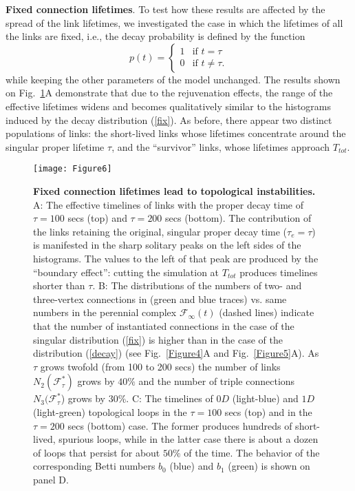 \documentclass[12pt,tightenlines]{revtex4}
\begin{document}
\textbf{Fixed connection lifetimes}. To test how these results are affected by the spread of the link lifetimes, we investigated 
the case in which the lifetimes of all the links are fixed, i.e., the decay probability is defined by the function
\begin{equation}
p(t) = \begin{cases} 1 &\mbox{if } t = \tau \\ 
0 & \mbox{if } t \neq \tau. 
\end{cases}
\label{fix}
\end{equation}
while keeping the other parameters of the model unchanged. The results shown on Fig.~\ref{Figure6}A demonstrate that 
due to the rejuvenation effects, the range of the effective lifetimes widens and becomes qualitatively similar to the 
histograms induced by the decay distribution (\ref{fix}). As before, there appear two distinct populations of links: the 
short-lived links whose lifetimes concentrate around the singular proper lifetime $\tau$, and the ``survivor'' links, 
whose lifetimes approach $T_{tot}$.

\begin{figure}[!h]
\texttt{[image: Figure6]}
\caption{{\footnotesize\textbf{Fixed connection lifetimes lead to topological instabilities.} A: The effective timelines of links 
with the proper decay time of $\tau = 100$ secs (top) and $\tau = 200$ secs (bottom). The contribution of the links retaining 
the original, singular proper decay time ($\tau_{e} = \tau$) is manifested in the sharp solitary peaks on the left sides of the 
histograms. The values to the left of that peak are produced by the ``boundary effect'': cutting the simulation at $T_{tot}$ 
produces timelines shorter than $\tau$. 
B: The distributions of the numbers of two- and three-vertex connections in (green and blue traces) vs. same numbers in 
the perennial complex $\mathcal{F}_{\infty}(t)$ (dashed lines) indicate that the number of instantiated connections in the 
case of the singular distribution (\ref{fix}) is higher than in the case of the distribution (\ref{decay}) (see Fig.~\ref{Figure4}A 
and Fig.~\ref{Figure5}A). 
As $\tau$ grows twofold (from 100 to 200 secs) the number of links $N_2(\mathcal{F}^{*}_{\tau})$ 
grows by $40\%$ and the number of triple connections $N_3(\mathcal{F}^{*}_{\tau}$) grows by $30\%$. 
C: The timelines of $0D$ (light-blue) and $1D$ (light-green) topological loops in the $\tau = 100$ secs (top) and in the 
$\tau = 200$ secs (bottom) case. The former produces hundreds of short-lived, spurious loops, while in the latter case there 
is about a dozen of loops that persist for about $50\%$ of the time. The behavior of the corresponding Betti numbers $b_0$ 
(blue) and $b_1$ (green) is shown on panel D.}}
\label{Figure6}
\end{figure}
\end{document}
